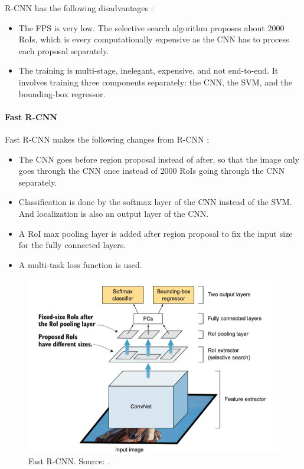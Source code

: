 \documentclass[a4paper,11pt,oneside]{article}
\begin{document}
  R-CNN has the following disadvantages \cite{elgendy2020deep, girshick2014rich, girshick2015fast}:

  \begin{itemize}
    \item The FPS is very low. The selective search algorithm proposes about 2000 RoIs, which is every computationally
    expensive as the CNN has to process each proposal separately.
    \item The training is multi-stage, inelegant, expensive, and not end-to-end. It involves training three components
    separately: the CNN, the SVM, and the bounding-box regressor.
  \end{itemize}

  \paragraph{Fast R-CNN}

  Fast R-CNN makes the following changes from R-CNN \cite{elgendy2020deep, girshick2015fast}:

  \begin{itemize}
    \item The CNN goes before region proposal instead of after, so that the image only goes through the CNN once instead
    of 2000 RoIs going through the CNN separately.
    \item Classification is done by the softmax layer of the CNN instead of the SVM. And localization is also an output
    layer of the CNN.
    \item A RoI max pooling layer is added after region proposal to fix the input size for the fully connected layers.
    \item A multi-task loss function is used.
  \end{itemize}

  \begin{figure}[ht]
    \begin{center}
      \includegraphics[width=.8\textwidth]{fast_r_cnn.png}
    \end{center}
    \caption{Fast R-CNN. Source: \cite{elgendy2020deep}.}
  \end{figure}
\end{document}
